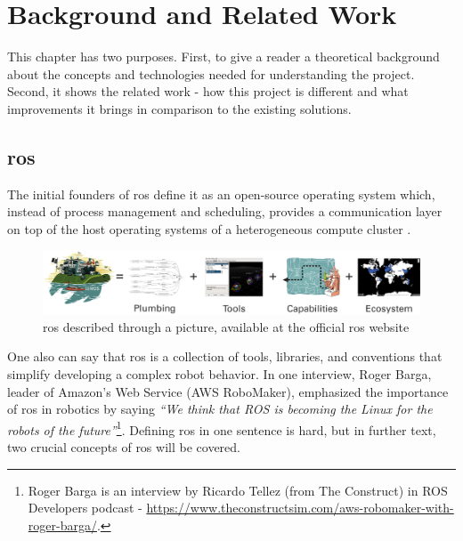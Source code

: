 \chapter{Background and Related Work}
\label{chap:background}

This chapter has two purposes.
First, to give a reader a theoretical background about the concepts and technologies needed for understanding the project.
Second, it shows the related work - how this project is different and what improvements it brings in comparison to the existing solutions.

\section{\ac{ros}}

The initial founders of \ac{ros} define it as an open-source operating system which, instead of process management and scheduling, provides a communication layer on top of the host operating systems of a heterogeneous compute cluster \cite{quigley_ros_nodate}.

\begin{figure}[H]
    \centering
    \includegraphics[width=\textwidth]{background/figures/ros_equation.png}
    \caption{\ac{ros} described through a picture, available at the official \ac{ros} website}
    \label{fig:background:ros_equation}
\end{figure}

One also can say that \ac{ros} is a collection of tools, libraries, and conventions that simplify developing a complex robot behavior.
In one interview, Roger Barga, leader of Amazon's Web Service (AWS RoboMaker), emphasized the importance of \ac{ros} in robotics by saying \textit{``We think that ROS is becoming the Linux for the robots of the future''}\footnote{Roger Barga is an interview by Ricardo Tellez (from The Construct) in ROS Developers podcast -    \url{https://www.theconstructsim.com/aws-robomaker-with-roger-barga/}.}.
Defining \ac{ros} in one sentence is hard, but in further text, two crucial concepts of \ac{ros} will be covered.

